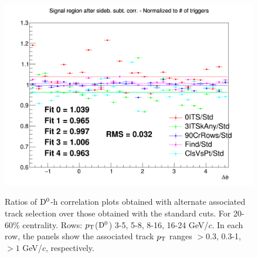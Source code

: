 \begin{figure}
{\includegraphics[width=0.31\linewidth]{figuresVsCent/Dzero/SystTrackEff/20_60/Ratio_AzimCorrDistr_Dzero_Canvas_PtIntBins12to12_PoolInt_thr1to99.png}} \\
 \caption{Ratios of ${\rm D^0}$-h correlation plots obtained with alternate associated track selection over those obtained with the standard cuts. For 20-60\% centrality. Rows: $p_{\rm T}$(${\rm D^0}$) 3-5, 5-8, 8-16, 16-24 GeV/$c$. In each row, the panels show the associated track
$p_{\rm T}$ ranges $> 0.3$, 0.3-1, $> 1$ GeV/$c$, respectively.}
\label{fig:SysTrEff2060}
\end{figure}
